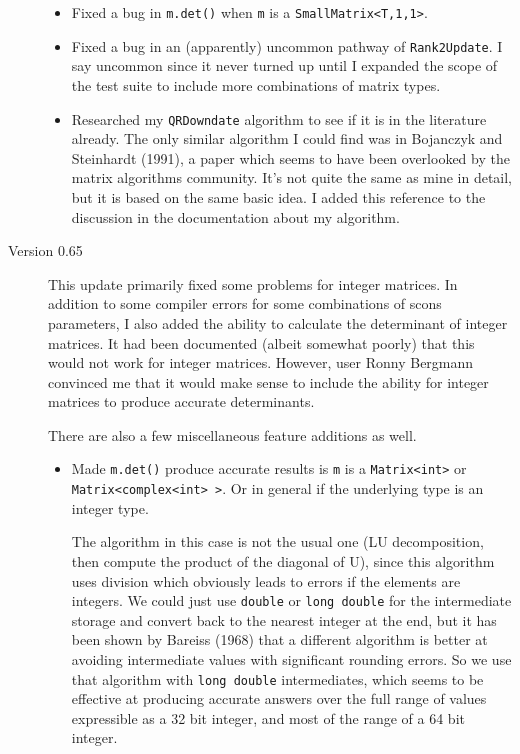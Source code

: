 \documentclass[twoside,letterpaper,11pt]{article}
\renewcommand{\tt}[1]{{\lstinline {#1}}}
\begin{document}
\begin{description}
\begin{itemize}
\item Fixed a bug in \tt{m.det()} when \tt{m} is a \tt{SmallMatrix<T,1,1>}.

\item Fixed a bug in an (apparently) uncommon pathway of \tt{Rank2Update}.
I say uncommon since it never turned up until I expanded the scope of
the test suite to include more combinations of matrix types.

\item Researched my \tt{QRDowndate} algorithm to see if it is in the literature already.
The only similar algorithm I could find was in Bojanczyk and Steinhardt (1991), 
a paper which seems to have been overlooked by the matrix algorithms community.
It's not quite the same as mine in detail, but it is based on the same basic idea.
I added this reference to the discussion in the documentation about my algorithm.

\end{itemize}

\item[Version 0.65]
This update primarily fixed some problems for integer matrices.  In addition to some compiler
errors for some combinations of scons parameters, I also added the ability to calculate the 
determinant of integer matrices.  It had been documented (albeit somewhat poorly) that 
this would not work for integer matrices.  However, user Ronny Bergmann convinced me that
it would make sense to include the ability for integer matrices to produce accurate determinants.

There are also a few miscellaneous feature additions as well.

\begin{itemize}

\item Made \tt{m.det()} produce accurate results is \tt{m} is a \tt{Matrix<int>} or 
\tt{Matrix<complex<int> >}.  Or in general if the underlying type is an integer type.

The algorithm in this case is not the usual one (LU decomposition, then compute the 
product of the diagonal of U), since this algorithm uses division which obviously leads 
to errors if the elements are integers.  We could just use \tt{double} or \tt{long double} for
the intermediate storage and convert back to the nearest integer at the end, but it has
been shown by Bareiss (1968) that a different algorithm is better at avoiding intermediate
values with significant rounding errors.  So we use that algorithm with \tt{long double} 
intermediates, which seems to be effective at producing accurate answers over the 
full range of values expressible as a 32 bit integer, and most of the range of a 64 bit 
integer.


\end{itemize}
\end{description}
\end{document}
